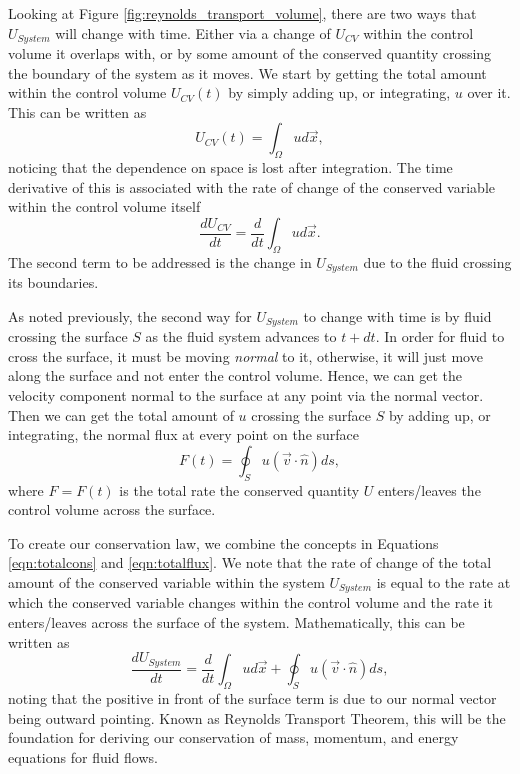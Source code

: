 Looking at Figure \ref{fig:reynolds_transport_volume}, there are two ways that $U_{System}$ will change with time. Either via a change of $U_{CV}$ within the control volume it overlaps with, or by some amount of the conserved quantity crossing the boundary of the system as it moves. We start by getting the total amount within the control volume $U_{CV}(t)$ by simply adding up, or integrating, $u$ over it. This can be written as
\begin{equation}
	\label{eqn:totalcons}
	U_{CV}(t) = \int_\Omega u d\vec{x},
\end{equation}
noticing that the dependence on space is lost after integration. The time derivative of this is associated with the rate of change of the conserved variable within the control volume itself
\begin{equation}
	\label{eqn:totalcons}
	\frac{dU_{CV}}{dt} = \frac{d}{dt}\int_\Omega u d\vec{x}.
\end{equation}
The second term to be addressed is the change in $U_{System}$ due to the fluid crossing its boundaries.

As noted previously, the second way for $U_{System}$ to change with time is by fluid crossing the surface $S$ as the fluid system advances to $t+dt$. In order for fluid to cross the surface, it must be moving {\it normal} to it, otherwise, it will just move along the surface and not enter the control volume. Hence, we can get the velocity component normal to the surface at any point via the normal vector. Then we can get the total amount of $u$ crossing the surface $S$ by adding up, or integrating, the normal flux at every point on the surface
\begin{equation}
	\label{eqn:totalflux}
	F(t) = \oint_S u (\vec{v} \cdot \hat{n}) ds,
\end{equation}
where $F = F(t)$ is the total rate the conserved quantity $U$ enters/leaves the control volume across the surface.

To create our conservation law, we combine the concepts in Equations \ref{eqn:totalcons} and \ref{eqn:totalflux}. We note that the rate of change of the total amount of the conserved variable within the system $U_{System}$ is equal to the rate at which the conserved variable changes within the control volume and the rate it enters/leaves across the surface of the system. Mathematically, this can be written as
\begin{equation}
	\frac{dU_{System}}{dt} = \frac{d}{dt}\int_\Omega u d\vec{x} + \oint_S u (\vec{v} \cdot \hat{n}) ds,
\end{equation}
noting that the positive in front of the surface term is due to our normal vector being outward pointing. Known as Reynolds Transport Theorem, this will be the foundation for deriving our conservation of mass, momentum, and energy equations for fluid flows.

